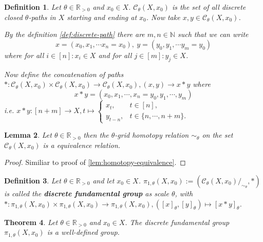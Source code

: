 \documentclass[a4paper, 11pt, twoside]{article}
\newcommand{\R}[0]{\mathbb{R}}
\newcommand{\N}[0]{\mathbb{N}}
\theoremstyle{break}
\newtheorem{thm}{Theorem}[section]
\theoremstyle{break}
\newtheorem{defin}[thm]{Definition}
\newtheorem{lemma}[thm]{Lemma}
\begin{document}
\begin{defin}
  Let $\theta \in \R_{>0}$ and $x_0 \in X$. $\mathcal{C}_{\theta}(X, x_0)$ is the set of all discrete closed $\theta$-paths in $X$ starting and ending at $x_0$. Now take $x, y \in \mathcal{C}_{\theta}(X, x_0)$.
  
  By the definition \ref{def:discrete-path} there are $m,n \in \N$ such that we can write
  \begin{equation*}
    x = (x_0, x_1, \cdots x_n = x_0), \: y = (y_0, y_1, \cdots y_m = y_0)
  \end{equation*} where for all $i \in [n]\colon x_i \in X$ and for all $j \in [m]: y_j \in X$.

  Now define the concatenation of paths $*\colon \mathcal{C}_{\theta}(X, x_0) \times \mathcal{C}_{\theta}(X, x_0) \to \mathcal{C}_{\theta}(X, x_0), (x, y) \to x * y$ where
  \begin{equation*}
    x * y = (x_0, x_1, \cdots, x_n = y_0, y_1, \cdots, y_m)
  \end{equation*}
  i.e. $x * y\colon [n+m] \to X, t \mapsto \begin{cases}
    x_t, &t \in [n], \\
    y_{t-n}, &t \in \{n, \cdots, n+m\}.
  \end{cases}$

  \cite[p. 3]{barcelo2014discrete}
\end{defin}

\begin{lemma} \label{lem:discrete-homotopy}
  Let $\theta \in \R_{>0}$ then the $\theta$-grid homotopy relation $\sim_{\theta}$ on the set $\mathcal{C}_{\theta}(X, x_0)$ is a equivalence relation.
\end{lemma}

\begin{proof}
  Similiar to proof of \ref{lem:homotopy-equivalence}.
\end{proof}

\begin{defin}
  Let $\theta \in \R_{>0}$ and let $x_0 \in X$. $\pi_{1,\theta}(X, x_0) := (\mathcal{C}_{\theta}(X, x_0)/_{\sim_{\theta}}, *)$ is called the \textbf{discrete fundamental group} as scale $\theta$,
  with $*\colon \pi_{1,\theta}(X, x_0) \times \pi_{1,\theta}(X, x_0) \to \pi_{1,\theta}(X, x_0), ([x]_{\theta}, [y]_{\theta}) \mapsto [x * y]_{\theta}$.
\end{defin}

\begin{thm}
  Let $\theta \in \R_{>0}$ and $x_0 \in X$. The discrete fundamental group $\pi_{1,\theta}(X, x_0)$ is a well-defined group.
\end{thm}
\end{document}
